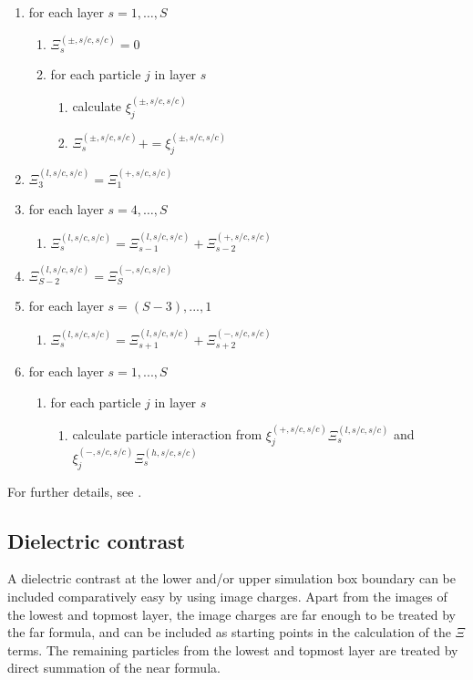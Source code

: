 \begin{enumerate}
\item for each layer $s=1,\ldots,S$ 
  \begin{enumerate}
  \item $\Xi^{(\pm,s/c,s/c)}_s=0$
  \item for each particle $j$ in layer $s$
    \begin{enumerate}
    \item calculate $\xi^{(\pm,s/c,s/c)}_j$
    \item $\Xi^{(\pm,s/c,s/c)}_s += \xi^{(\pm,s/c,s/c)}_j$
    \end{enumerate}
  \end{enumerate}
\item $\Xi^{(l,s/c,s/c)}_3=\Xi^{(+,s/c,s/c)}_1$
\item for each layer $s=4,\ldots,S$
  \begin{enumerate}
  \item $\Xi^{(l,s/c,s/c)}_s=\Xi^{(l,s/c,s/c)}_{s-1} +
    \Xi^{(+,s/c,s/c)}_{s-2}$
  \end{enumerate}
\item $\Xi^{(l,s/c,s/c)}_{S-2}=\Xi^{(-,s/c,s/c)}_S$
\item for each layer $s=(S-3),...,1$ 
  \begin{enumerate}
  \item $\Xi^{(l,s/c,s/c)}_s=\Xi^{(l,s/c,s/c)}_{s+1} +
    \Xi^{(-,s/c,s/c)}_{s+2}$
  \end{enumerate}
\item for each layer $s=1,...,S$
  \begin{enumerate}
  \item for each particle $j$ in layer $s$ 
    \begin{enumerate}
    \item calculate particle interaction from
      $\xi^{(+,s/c,s/c)}_j\Xi^{(l,s/c,s/c)}_s$ and
      $\xi^{(-,s/c,s/c)}_j\Xi^{(h,s/c,s/c)}_s$
    \end{enumerate}
  \end{enumerate}
\end{enumerate}

For further details, see
\citet{arnold02a,arnold02b,arnold02c,arnold02d}.

\subsection{Dielectric contrast}

A dielectric contrast at the lower and/or upper simulation box
boundary can be included comparatively easy by using image charges.
Apart from the images of the lowest and topmost layer, the image
charges are far enough to be treated by the far formula, and can be
included as starting points in the calculation of the $\Xi$ terms. The
remaining particles from the lowest and topmost layer are treated by
direct summation of the near formula.


